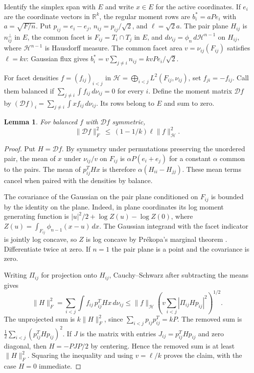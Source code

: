 \documentclass[11pt,reqno]{amsart}
\newtheorem{lemma}[theorem]{Lemma}
\newcommand{\R}{\mathbb R}
\newcommand{\norm}[1]{\lVert #1\rVert}
\newcommand{\HH}{\mathcal H}
\newcommand{\DD}{\mathcal D}
\begin{document}
Identify the simplex span with $E$ and write $x\in E$ for the active
coordinates. If $e_i$ are the coordinate vectors in $\R^k$, the regular
moment rows are $b_i^*=aPe_i$ with $a=\sqrt{F/n}$. Put
$p_{ij}=e_i-e_j$, $n_{ij}=p_{ij}/\sqrt2$, and $\ell=\sqrt2a$. The pair
plane $H_{ij}$ is $n_{ij}^{\perp}$ in $E$, the common facet is
$F_{ij}=T_i\cap T_j$ in $E$, and $d\nu_{ij}=\phi_n\,d\mathcal H^{n-1}$ on
$H_{ij}$, where $\mathcal H^{n-1}$ is Hausdorff measure. The common facet
area $v=\nu_{ij}(F_{ij})$ satisfies $\ell=kv$: Gaussian flux gives
$b_i^*=v\sum_{j\ne i}n_{ij}=kvPe_i/\sqrt2$.

For facet densities $f=(f_{ij})_{i<j}$ in
$\HH=\bigoplus_{i<j}L^2(F_{ij},\nu_{ij})$, set $f_{ji}=-f_{ij}$.
Call them balanced if $\sum_{j\ne i}\int f_{ij}\,d\nu_{ij}=0$ for
every $i$. Define the moment matrix $\DD f$ by
$(\DD f)_i=\sum_{j\ne i}\int x f_{ij}\,d\nu_{ij}$. Its rows belong to
$E$ and sum to zero.

\begin{lemma}\label{lem:interface}
For balanced $f$ with $\DD f$ symmetric,
\[
 \norm{\DD f}_F^2\ \le\ (1-1/k)\ell\norm f_\HH^2.
\]
\end{lemma}

\begin{proof}
Put $H=\DD f$. By symmetry under permutations preserving the unordered
pair, the mean of $x$ under $\nu_{ij}/v$ on $F_{ij}$ is
$\alpha P(e_i+e_j)$ for a constant $\alpha$ common to the pairs. The
mean of $p_{ij}^THx$ is therefore $\alpha(H_{ii}-H_{jj})$. These mean
terms cancel when paired with the densities by balance.

The covariance of the Gaussian on the pair plane conditioned on
$F_{ij}$ is bounded by the identity on the plane. Indeed, in plane
coordinates its log moment generating function is
$|u|^2/2+\log Z(u)-\log Z(0)$, where
$Z(u)=\int_{F_{ij}}\phi_{n-1}(x-u)\,dx$. The Gaussian integrand with
the facet indicator is jointly log concave, so $Z$ is log concave by
Prékopa's marginal theorem \cite[Theorem~6]{Prekopa}. Differentiate
twice at zero. If $n=1$ the pair plane is a point and the covariance
is zero.

Writing $\Pi_{ij}$ for projection onto $H_{ij}$, Cauchy--Schwarz after
subtracting the means gives
\[
 \norm H_F^2=\sum_{i<j}\int f_{ij}\,p_{ij}^{T}Hx\,d\nu_{ij}
 \le \norm f_\HH
      \left(v\sum_{i<j}|\Pi_{ij}Hp_{ij}|^2\right)^{1/2}.
\]
The unprojected sum is $k\norm H_F^2$, since
$\sum_{i<j}p_{ij}p_{ij}^T=kP$. The removed sum is
$\tfrac12\sum_{i<j}(p_{ij}^THp_{ij})^2$. If $J$ is the matrix with
entries $J_{ij}=p_{ij}^THp_{ij}$ and zero diagonal, then
$H=-PJP/2$ by centering. Hence the removed sum is at least
$\norm H_F^2$. Squaring the inequality and using $v=\ell/k$ proves
the claim, with the case $H=0$ immediate.
\end{proof}
\end{document}
